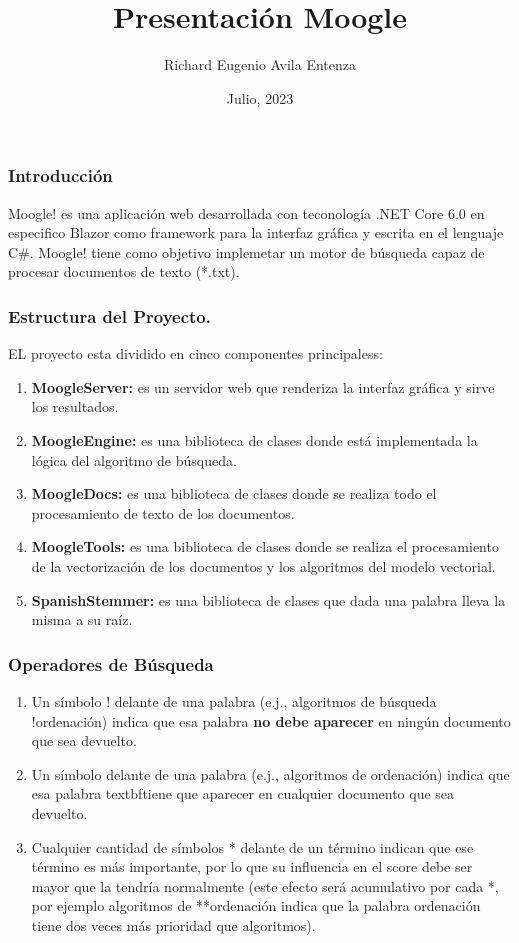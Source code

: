 \documentclass[12pt]{beamer}
\author{Richard Eugenio Avila Entenza}
\title{Presentación Moogle}
\subtitle{}
\institute{Facultad de Matemática y Computación\\Universidad de la Habana}
\date{Julio, 2023}
\begin{document}
	\maketitle
	
	\begin{frame}
		\frametitle{Introducción}
		
		Moogle! es una aplicación web desarrollada con teconología .NET Core 6.0 en especifico Blazor como framework para la interfaz gráfica y escrita en el lenguaje C\#. Moogle! tiene como objetivo implemetar un motor de búsqueda capaz de procesar documentos de texto (*.txt).
		
	\end{frame}
	
	\begin{frame}[fragile]
		\frametitle{Estructura del Proyecto.}
		
		EL proyecto esta dividido en cinco componentes principaless:
		\begin{enumerate}
			\item \textbf{MoogleServer:} es un servidor web que renderiza la interfaz gráfica y sirve los resultados.
			\item \textbf{MoogleEngine:} es una biblioteca de clases donde está implementada la lógica del algoritmo de búsqueda.
			\item \textbf{MoogleDocs:} es una biblioteca de clases donde se realiza todo el procesamiento de texto de los documentos.
			\item \textbf{MoogleTools:} es una biblioteca de clases donde se realiza el procesamiento de la vectorización de los documentos y los algoritmos del modelo vectorial.
			\item \textbf{SpanishStemmer:} es una biblioteca de clases que dada una palabra lleva la misma a su raíz.
		\end{enumerate}
	\end{frame}
	
	\begin{frame}
		\frametitle{Operadores de Búsqueda}
		
		\begin{enumerate}
			\item Un símbolo ! delante de una palabra (e.j., algoritmos de búsqueda !ordenación) indica que esa palabra \textbf{no debe aparecer} en ningún documento que sea devuelto.
			\item Un símbolo  delante de una palabra (e.j., algoritmos de ordenación) indica que esa palabra textbf{tiene que aparecer} en cualquier documento que sea devuelto.
			\item Cualquier cantidad de símbolos * delante de un término indican que ese término es más importante, por lo que su influencia en el score debe ser mayor que la tendría normalmente (este efecto será acumulativo por cada *, por ejemplo algoritmos de **ordenación indica que la palabra ordenación tiene dos veces más prioridad que algoritmos).
		\end{enumerate}
	\end{frame}
	
\end{document}

